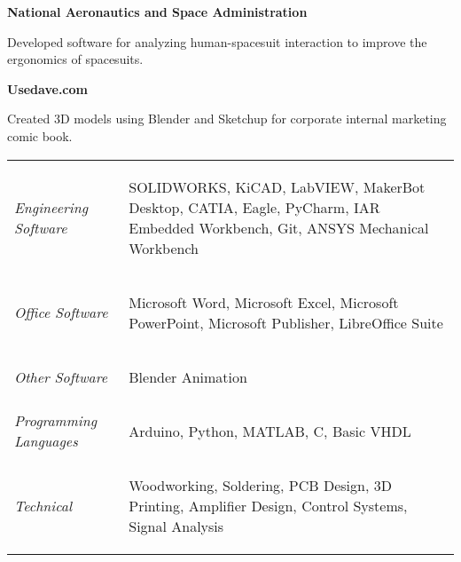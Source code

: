 \documentclass[letterpaper,ddMMMyyyy,nonstopmode]{simpleresumecv}
\newcommand{\descriptionWidth}{33em}
\newcommand{\tableWidth}{23.5em}
\newenvironment{Description}
{%
	\SmallGap
	\par
	\begin{Detail}
		\Item
		\begin{minipage}{\descriptionWidth}
}
{\par
\end{minipage}
\end{Detail}
}
\begin{document}
\begin{Body}
		\Entry\textbf{National Aeronautics and Space Administration}\hfill{}\\

		\begin{Description}
			Developed software for analyzing human-spacesuit interaction to improve the ergonomics of spacesuits.
		\end{Description}
		\Gap

		\Entry\textbf{Usedave.com}\hfill{}

		\begin{Description}
				Created 3D models using Blender and Sketchup for corporate internal marketing comic book.

		\end{Description}



		\Gap
		\def\arraystretch{0}%
		\hspace*{-0.8em}
		\begin{tabular}[t]{p{6em} p{\tableWidth}}
			\textit{Engineering Software} &
			\begin{Detail}
				SOLIDWORKS, KiCAD, LabVIEW, MakerBot Desktop, CATIA, Eagle, PyCharm, IAR Embedded Workbench, Git, ANSYS Mechanical Workbench
			\end{Detail}\\
			\textit{Office Software} &
			\begin{Detail}
				Microsoft Word, Microsoft Excel, Microsoft PowerPoint, Microsoft Publisher, LibreOffice Suite
			\end{Detail}\\
			\textit{Other Software}&
			\begin{Detail}
				Blender Animation\newline~\newline
			\end{Detail}\\
			\textit{Programming Languages} &
			\begin{Detail}
				Arduino, Python, MATLAB, C, Basic VHDL\newline~\newline
			\end{Detail}\\
			\textit{Technical}&
			\begin{Detail}
				Woodworking, Soldering, PCB Design, 3D Printing, Amplifier Design, Control Systems, Signal Analysis
			\end{Detail}
		\end{tabular}



\end{Body}
\end{document}

